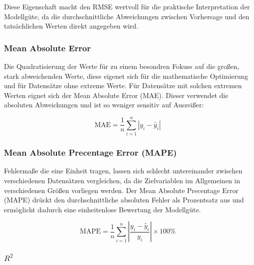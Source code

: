 Diese Eigenschaft macht den RMSE wertvoll für die praktische Interpretation der Modellgüte, da die durchschnittliche Abweichungen zwischen Vorhersage und den tatsächlichen Werten direkt angegeben wird. 

\subsubsection{Mean Absolute Error}
Die Quadratisierung der Werte für zu einem besondren Fokuss auf die großen, stark abweichenden Werte, diese eigenet sich für die mathematische Optimierung und für Datensätze ohne extreme Werte. Für Datensätze mit solchen extremen Werten eignet sich der Mean Absolute Error (MAE). Dieser verwendet die absoluten Abweichungen und ist so weniger sensitiv auf Ausreißer:

\begin{equation}
  \text{MAE} = \frac{1}{n} \sum_{i=1}^{n} |y_i - \hat{y}_i|
  \label{eq:mae}
\end{equation}

\subsubsection{Mean Absolute Precentage Error (MAPE)}

Fehlermaße die eine Einheit tragen, lassen sich schlecht untereinander zwischen verschiedenen Datensätzen vergleichen, da die Zielvariablen im Allgemeinen in verschiedenen Größen vorliegen werden. Der Mean Absolute Precentage Error (MAPE) drückt den durchschnittliche absoluten Fehler als Prozentsatz aus und ermöglicht dadurch eine einheitenlose Bewertung der Modellgüte.

\begin{equation}
\text{MAPE} = \frac{1}{n} \sum_{i=1}^{n} \left|\frac{y_i - \hat{y}_i}{y_i}\right| \times 100\%
\label{eq:mape}
\end{equation}

\subsubsection{\(R^2\)}

